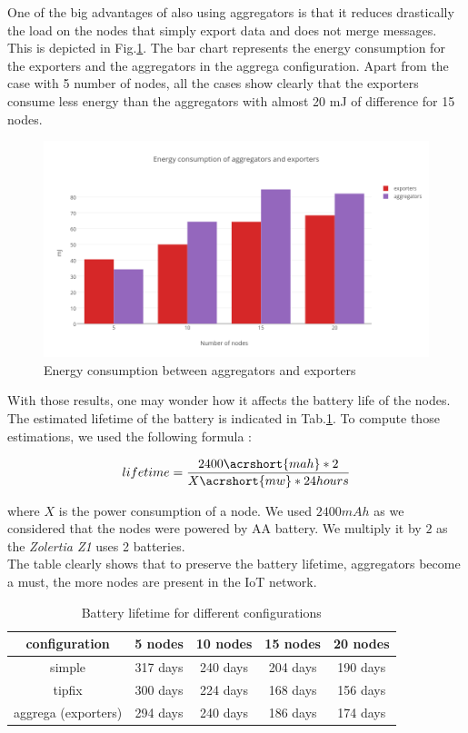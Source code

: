 One of the big advantages of also using aggregators is that it reduces drastically the load on the nodes that simply export data and does not merge messages. This is depicted in Fig.\ref{fig:aggrega_energy}. The bar chart represents the energy consumption for the exporters and the aggregators in the aggrega configuration. Apart from the case with 5 number of nodes, all the cases show clearly that the exporters consume less energy than the aggregators with almost 20 mJ of difference for 15 nodes.\\

\begin{figure}[h]
  \includegraphics[width=\textwidth]{res/energy_aggrega}
  \caption{Energy consumption between aggregators and exporters}
  \label{fig:aggrega_energy}
\end{figure}

With those results, one may wonder how it affects the battery life of the nodes. The estimated lifetime of the battery is indicated in Tab.\ref{tab:battery_lifetime}. To compute those estimations, we used the following formula :

\begin{equation}
  lifetime = \frac{2400 \acrshort{mah} * 2}{X \acrshort{mw} * 24 hours}
\end{equation}

where $X$ is the power consumption of a node. We used $2400mAh$ as we considered that the nodes were powered by AA battery. We multiply it by $2$ as the \textit{Zolertia Z1} uses 2 batteries. \\

The table clearly shows that to preserve the battery lifetime, aggregators become a must, the more nodes are present in the IoT network.

\begin{table}
  \centering
  \begin{tabular}{|c|c|c|c|c|}
    \hline
    configuration & 5 nodes & 10 nodes & 15 nodes & 20 nodes \\
    \hline
    simple & 317 days & 240 days & 204 days & 190 days\\
    \hline
    tipfix & 300 days & 224 days & 168 days & 156 days\\
    \hline
    aggrega (exporters) & 294 days & 240 days & 186 days & 174 days \\
    \hline
  \end{tabular}
  \caption{Battery lifetime for different configurations}
  \label{tab:battery_lifetime}
\end{table}


